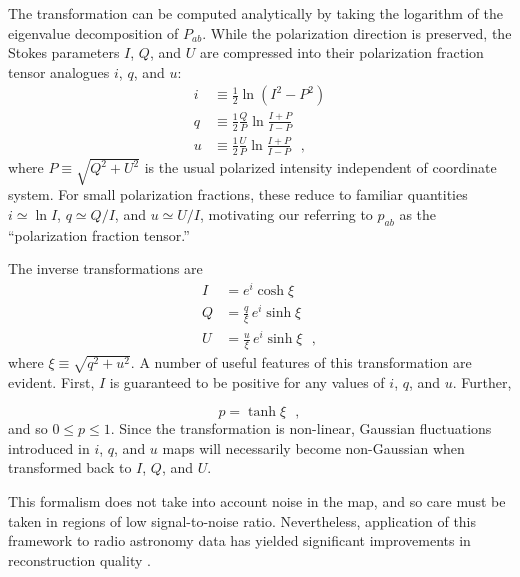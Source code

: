 \documentclass[twocolumn]{aastex631}
\begin{document}
The transformation can be computed analytically by taking the logarithm of the eigenvalue decomposition of $P_{ab}$. While the polarization direction is preserved, the Stokes parameters $I$, $Q$, and $U$ are compressed into their polarization fraction tensor analogues $i$, $q$, and $u$:
\begin{align}\label{eq:real2pt}
    i &\equiv \frac{1}{2} \ln (I^2 - P^2)\nonumber  \\
    q &\equiv  \frac{1}{2}\frac{Q}{P} \ln \frac{I+P}{I-P} \\
    u &\equiv  \frac{1}{2}\frac{U}{P} \ln \frac{I+P}{I-P}\nonumber 
    ~~~,
\end{align}
where $P \equiv \sqrt{Q^2 + U^2}$ is the usual polarized intensity independent of coordinate system. For small polarization fractions, these reduce to familiar quantities $i\simeq\ln I$, $q\simeq Q/I$, and $u\simeq U/I$, motivating our referring to $p_{ab}$ as the ``polarization fraction tensor.''

The inverse transformations are
\begin{align}\label{eq:pt2real}
    I &= e^i \cosh \xi \nonumber \\
    Q &= \frac{q}{\xi}\,e^i\sinh \xi  \\
    U &= \frac{u}{\xi}\,e^i\sinh \xi \nonumber
    ~~~,
\end{align}
where $\xi \equiv \sqrt{q^2 + u^2}$. A number of useful features of this transformation are evident. First, $I$ is guaranteed to be positive for any values of $i$, $q$, and $u$. Further,

\begin{equation}
    p = \tanh\xi
    ~~~,
\end{equation}
and so $0 \leq p \leq 1$. Since the transformation is non-linear, Gaussian fluctuations introduced in $i$, $q$, and $u$ maps will necessarily become non-Gaussian when transformed back to $I$, $Q$, and $U$.

This formalism does not take into account noise in the map, and so care must be taken in regions of low signal-to-noise ratio. Nevertheless, application of this framework to radio astronomy data has yielded significant improvements in reconstruction quality \citep{Arras:2021}.
\end{document}

